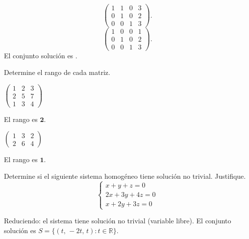 \documentclass{emate-ucr}
\begin{document}
\begin{ejercicio}[\ptsguiaej]
\begin{solucion}
    \[
      \left(\begin{array}{ccc|r}
        1 & 1 & 0 & 3 \\
        0 & 1 & 0 & 2 \\
        0 & 0 & 1 & 3
      \end{array}\right).
    \]
    \[
      \left(\begin{array}{ccc|r}
        1 & 0 & 0 & 1 \\
        0 & 1 & 0 & 2 \\
        0 & 0 & 1 & 3
      \end{array}\right).
    \]
    El conjunto solución es  .
  \end{solucion}
\end{ejercicio}

\begin{ejercicio}[25]
  Determine el rango de cada matriz.

  \begin{subejercicios}
    \item $\begin{pmatrix} 1 & 2 & 3 \\ 2 & 5 & 7 \\ 1 & 3 & 4 \end{pmatrix}$

    \begin{solucion}
      El rango es $\mathbf{2}$.
    \end{solucion}

    \item $\begin{pmatrix} 1 & 3 & 2 \\ 2 & 6 & 4 \end{pmatrix}$

    \begin{solucion}
      El rango es $\mathbf{1}$.
    \end{solucion}
  \end{subejercicios}
\end{ejercicio}

\begin{ejercicio}[25]
  Determine si el siguiente sistema homogéneo tiene solución no trivial.
  Justifique.
  \[
    \begin{cases}
       x +  y +  z = 0 \\
      2x + 3y + 4z = 0 \\
       x + 2y + 3z = 0
    \end{cases}
  \]

  \begin{solucion}
    Reduciendo: el sistema tiene solución no trivial (variable libre).
    El conjunto solución es $S = \{(t,\,-2t,\,t) : t \in \mathbb{R}\}$.
  \end{solucion}
\end{ejercicio}
\end{document}
